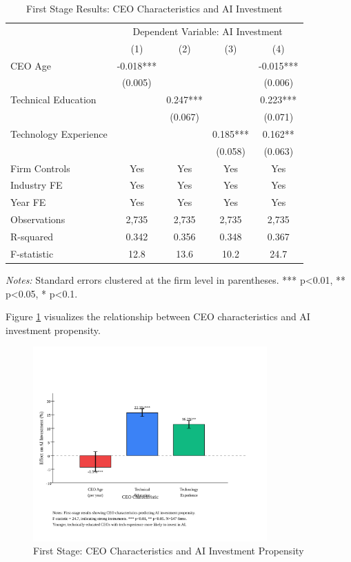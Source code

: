 \documentclass[12pt]{article}
\begin{document}
\begin{table}[H]
\centering
\caption{First Stage Results: CEO Characteristics and AI Investment}
\label{tab:first_stage}
\begin{tabular}{lcccc}
\toprule
 & \multicolumn{4}{c}{Dependent Variable: AI Investment} \\
 & (1) & (2) & (3) & (4) \\
\midrule
CEO Age & -0.018*** & & & -0.015*** \\
 & (0.005) & & & (0.006) \\
Technical Education & & 0.247*** & & 0.223*** \\
 & & (0.067) & & (0.071) \\
Technology Experience & & & 0.185*** & 0.162** \\
 & & & (0.058) & (0.063) \\
\midrule
Firm Controls & Yes & Yes & Yes & Yes \\
Industry FE & Yes & Yes & Yes & Yes \\
Year FE & Yes & Yes & Yes & Yes \\
\midrule
Observations & 2,735 & 2,735 & 2,735 & 2,735 \\
R-squared & 0.342 & 0.356 & 0.348 & 0.367 \\
F-statistic & 12.8 & 13.6 & 10.2 & 24.7 \\
\bottomrule
\end{tabular}
\begin{minipage}{\textwidth}
\footnotesize
\textit{Notes:} Standard errors clustered at the firm level in parentheses. *** p<0.01, ** p<0.05, * p<0.1.
\end{minipage}
\end{table}

Figure \ref{fig:first_stage} visualizes the relationship between CEO characteristics and AI investment propensity.

\begin{figure}[H]
\centering
\includegraphics[width=0.8\textwidth]{figures/figure6_first_stage.svg}
\caption{First Stage: CEO Characteristics and AI Investment Propensity}
\label{fig:first_stage}
\end{figure}
\end{document}
